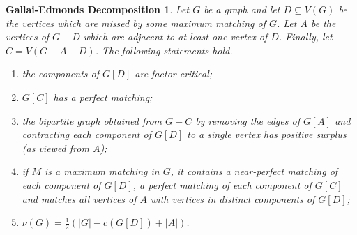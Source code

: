 \documentclass[12pt]{article}
\theoremstyle{plain}
\newtheorem*{GallaiEdmonds}{Gallai-Edmonds Decomposition}
\theoremstyle{definition}
\theoremstyle{remark}
\newcommand{\card}[1]{\left|#1\right|}
\begin{document}
\begin{GallaiEdmonds}
Let $G$ be a graph and let $D \subseteq V(G)$ be the vertices which are missed by some maximum matching of $G$.  Let $A$ be the vertices of $G - D$ which are adjacent to at least one vertex of $D$.  Finally, let $C = V(G - A - D)$. The following statements hold.
\begin{enumerate}
\item the components of $G[D]$ are factor-critical; 
\item $G[C]$ has a perfect matching; 
\item the bipartite graph obtained from $G - C$ by removing the edges of $G[A]$ and contracting each component of $G[D]$ to a single vertex has positive surplus (as viewed from $A$); 
\item if $M$ is a maximum matching in $G$, it contains a near-perfect matching of each component of $G[D]$, a perfect matching of each component of $G[C]$ and matches all vertices of $A$ with vertices in distinct components of $G[D]$; 
\item $\nu(G) = \frac12 \left(\card{G} - c(G[D]) + \card{A}\right)$. 
\end{enumerate}
\end{GallaiEdmonds}
\end{document}
